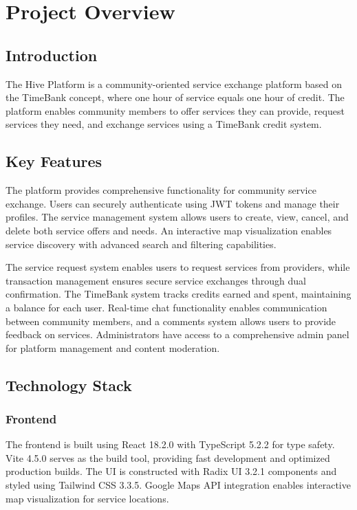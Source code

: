 \documentclass[12pt,a4paper]{report}
\begin{document}
\chapter{Project Overview}

\section{Introduction}

The Hive Platform is a community-oriented service exchange platform based on the TimeBank concept, where one hour of service equals one hour of credit. The platform enables community members to offer services they can provide, request services they need, and exchange services using a TimeBank credit system.

\section{Key Features}

The platform provides comprehensive functionality for community service exchange. Users can securely authenticate using JWT tokens and manage their profiles. The service management system allows users to create, view, cancel, and delete both service offers and needs. An interactive map visualization enables service discovery with advanced search and filtering capabilities.

The service request system enables users to request services from providers, while transaction management ensures secure service exchanges through dual confirmation. The TimeBank system tracks credits earned and spent, maintaining a balance for each user. Real-time chat functionality enables communication between community members, and a comments system allows users to provide feedback on services. Administrators have access to a comprehensive admin panel for platform management and content moderation.

\section{Technology Stack}

\subsection{Frontend}

The frontend is built using React 18.2.0 with TypeScript 5.2.2 for type safety. Vite 4.5.0 serves as the build tool, providing fast development and optimized production builds. The UI is constructed with Radix UI 3.2.1 components and styled using Tailwind CSS 3.3.5. Google Maps API integration enables interactive map visualization for service locations.
\end{document}
